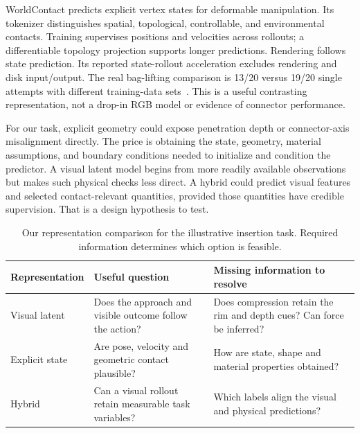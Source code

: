 


WorldContact predicts explicit vertex states for deformable manipulation. Its tokenizer distinguishes spatial, topological, controllable, and environmental contacts. Training supervises positions and velocities across rollouts; a differentiable topology projection supports longer predictions. Rendering follows state prediction. Its reported state-rollout acceleration excludes rendering and disk input/output. The real bag-lifting comparison is 13/20 versus 19/20 single attempts with different training-data sets~\citep[Secs.~III--V]{worldcontact}. This is a useful contrasting representation, not a drop-in RGB model or evidence of connector performance.

For our task, explicit geometry could expose penetration depth or connector-axis misalignment directly. The price is obtaining the state, geometry, material assumptions, and boundary conditions needed to initialize and condition the predictor. A visual latent model begins from more readily available observations but makes such physical checks less direct. A hybrid could predict visual features and selected contact-relevant quantities, provided those quantities have credible supervision. That is a design hypothesis to test.

\begin{table}[H]\centering\small
\caption{Our representation comparison for the illustrative insertion task. Required information determines which option is feasible.}
\begin{tabularx}{\linewidth}{@{}p{28mm}YY@{}}\toprule
Representation & Useful question & Missing information to resolve\\\midrule
Visual latent & Does the approach and visible outcome follow the action? & Does compression retain the rim and depth cues? Can force be inferred?\\
Explicit state & Are pose, velocity and geometric contact plausible? & How are state, shape and material properties obtained?\\
Hybrid & Can a visual rollout retain measurable task variables? & Which labels align the visual and physical predictions?\\\bottomrule
\end{tabularx}
\end{table}

